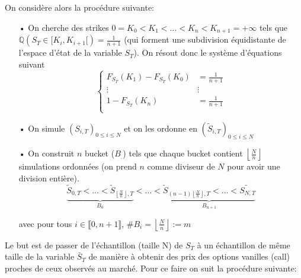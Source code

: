 \documentclass[a4paper,12pt]{report}
\numberwithin{equation}{section}
\theoremstyle{definition}
\numberwithin{equation}{section}
\begin{document}
On considère alors la procédure suivante:
\begin{itemize}
\item[•] On cherche \label{strike} des strikes $0=K_{0}<K_{1}<\dots<K_{n}<K_{n+1}=+\infty$ tels que $\mathbb{Q}(S_{T}\in[K_{i},K_{i+1}[)=\frac{1}{n+1}$ (qui forment une subdivision équidistante de l'espace d'état de la variable $S_T$). On résout donc le système d'équations suivant   
$$\left\{
    \begin{array}{ll}
       F_{S_{T}}(K_{1})-F_{S_{T}}(K_{0}) & =\frac{1}{n+1}\\
        \vdots & \vdots\\
       1-F_{S_{T}}(K_{n})  &=\frac{1}{n+1}\\
    \end{array}
\right.$$

\item[•] On simule $\left(S_{i,T}\right)_{0\leq i\leq N}$ et on les ordonne en $\left(\tilde{S}_{i,T}\right)_{0\leq i\leq N}$

\item[•] On construit $n$ bucket ($B_{.}$) tels que chaque bucket contient $\left\lfloor \frac{N}{n}\right\rfloor$ simulations ordonnées (on prend $n$ comme diviseur de $N$ pour avoir une division entière).$$\underbrace{\tilde{S}_{0,T}<\dots<\tilde{S}_{\left\lfloor \frac{N}{n}\right\rfloor ,T}}_{B_{0}}<\dots<\underbrace{\tilde{S}_{(n-1)\left\lfloor \frac{N}{n}\right\rfloor ,T}<\dots<\tilde{S_{N,T}}}_{B_{n+1}}$$

avec pour tous $i\in\llbracket0,n+1\rrbracket$, $\#B_{i}=\left\lfloor \frac{N}{n}\right\rfloor :=m$

\end{itemize}
\vspace*{0.3cm}
Le but est de passer de l'échantillon (taille N) de $S_{T}$ à un échantillon de même taille de la variable $\bar{S}_{T}$ de manière à obtenir des prix des options vanilles (call) proches de ceux observés au marché. Pour ce faire on suit la procédure suivante:
\vspace*{0.3cm}
\end{document}
